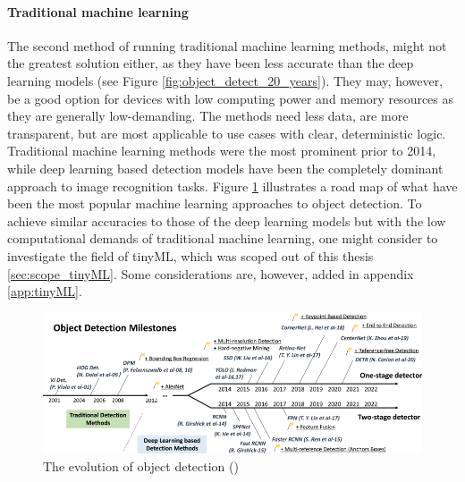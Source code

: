 \paragraph{Traditional machine learning}
The second method of running traditional machine learning methods, might not the greatest solution either, as they have been less accurate than the deep learning models (see Figure \ref{fig:object_detect_20_years}). They may, however, be a good option for devices with low computing power and memory resources as they are generally low-demanding. The methods need less data, are more transparent, but are most applicable to use cases with clear, deterministic logic. Traditional machine learning methods were the most prominent prior to 2014, while deep learning based detection models have been the completely dominant approach to image recognition tasks. Figure \ref{fig:road_map} illustrates a road map of what have been the most popular machine learning approaches to object detection. To achieve similar accuracies to those of the deep learning models but with the low computational demands of traditional machine learning, one might consider to investigate the field of tinyML, which was scoped out of this thesis \ref{sec:scope_tinyML}. Some considerations are, however, added in appendix \ref{app:tinyML}.

\begin{figure}[H]
    \centering
    \includegraphics[width=1\linewidth]{Images/Diagrams/object_detection_directions.png}
    \caption{\centering The evolution of object detection (\cite{zou2023object_detection_in_20_years})}
    \label{fig:road_map}
\end{figure}

